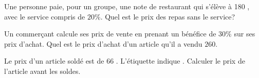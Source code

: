 \documentclass[11pt,a4paper]{article}  %
\begin{document}

\begin{enumMet}
	\item Une personne paie, pour un groupe, une note de restaurant qui s'élève à 180 \EUR{}, avec le service compris de $20 \%$. Quel est le prix des repas sans le service?
	\item {} Un commerçant calcule ses prix de vente en prenant un bénéfice de $30 \%$ sur ses prix d'achat. Quel est le prix d'achat d'un article qu'il a vendu $260$\EUR{}.
	\item Le prix d'un article soldé est de $66$ \EUR{}. L'étiquette indique . Calculer le prix de l'article avant les soldes.
\end{enumMet}
\end{document}
